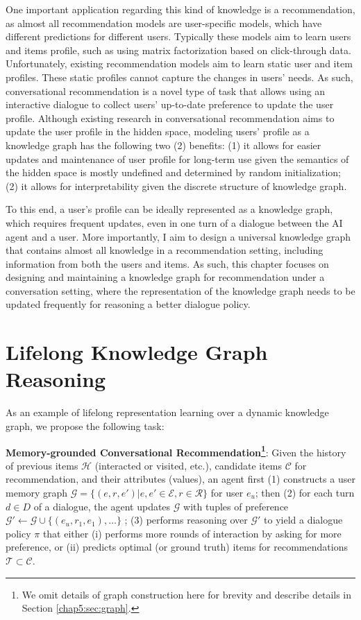 One important application regarding this kind of knowledge is a recommendation, as almost all recommendation models are user-specific models, which have different predictions for different users.
Typically these models aim to learn users and items profile, such as using matrix factorization based on click-through data.
Unfortunately, existing recommendation models aim to learn static user and item profiles.
These static profiles cannot capture the changes in users' needs.
As such, conversational recommendation \cite{neurips,cmu} is a novel type of task that allows using an interactive dialogue to collect users' up-to-date preference to update the user profile.
Although existing research in conversational recommendation aims to update the user profile in the hidden space, modeling users' profile as a knowledge graph has the following two (2) benefits: (1) it allows for easier updates and maintenance of user profile for long-term use given the semantics of the hidden space is mostly undefined and determined by random initialization; (2) it allows for interpretability given the discrete structure of knowledge graph.

To this end, a user's profile can be ideally represented as a knowledge graph, which requires frequent updates, even in one turn of a dialogue between the AI agent and a user.
More importantly, I aim to design a universal knowledge graph that contains almost all knowledge in a recommendation setting, including information from both the users and items.
As such, this chapter focuses on designing and maintaining a knowledge graph for recommendation under a conversation setting, where the representation of the knowledge graph needs to be updated frequently for reasoning a better dialogue policy.

\section{Lifelong Knowledge Graph Reasoning}
\label{chap5:sec:reason}

As an example of lifelong representation learning over a dynamic knowledge graph, we propose the following task:
 
\noindent\textbf{Memory-grounded Conversational Recommendation\footnote{We omit details of graph construction here for brevity and describe details in Section \ref{chap5:sec:graph}.}}:
Given the history of previous items $\mathcal{H}$ (interacted or visited, etc.), candidate items $\mathcal{C}$ for recommendation, and their attributes (values), 
an agent first (1) constructs a user memory graph $\mathcal{G} = \{(e, r, e')\vert e, e' \in \mathcal{E}, r \in \mathcal{R} \}$ for user $e_u$; 
then (2) for each turn $d \in D$ of a dialogue, the agent updates $\mathcal{G}$ with tuples of preference $\mathcal{G}' \gets \mathcal{G} \cup \{(e_u, r_1, e_1), \dots\}$ ;
(3) performs reasoning over $\mathcal{G}'$ to yield a dialogue policy $\pi$ that
either (i) performs more rounds of interaction by asking for more preference, 
or (ii) predicts optimal (or ground truth) items for recommendations $\mathcal{T} \subset \mathcal{C}$.

